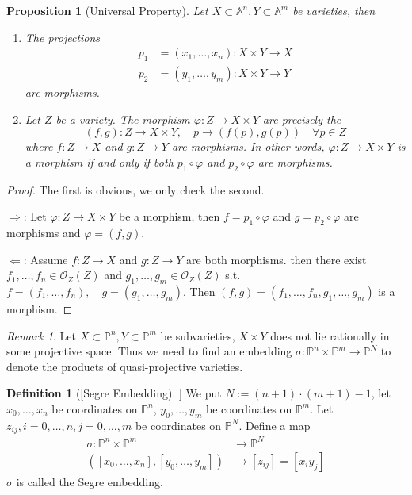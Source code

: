 \documentclass{amsart}
\theoremstyle{plain}
\newtheorem{proposition}{Proposition}
\theoremstyle{definition}
\newtheorem{definition}{Definition}
\theoremstyle{remark}
\newtheorem*{remark}{Remark}
\numberwithin{equation}{section}
\begin{document}
\begin{proposition}[Universal Property]\label{19}
	Let $ X\subset\mathbb{A}^n,Y \subset \mathbb{A}^m$ be varieties, then
	\begin{enumerate}
		\item The projections
		$$\begin{array}{cc}
			p_1 & =(x_1,\dots,x_n): X\times Y\to X\\
			p_2 & =(y_1,\dots,y_m): X\times Y\to Y
		\end{array}$$
		are morphisms.
		\item Let $ Z $ be a variety. The morphism $ \varphi : Z\to X \times Y $ are precisely the
		$$
		(f,g):Z\to X\times Y,\quad p\to (f(p),g(p))\quad\forall p\in Z
		$$
		where $ f:Z\to X $ and $ g:Z\to Y $ are morphisms. In other words, $ \varphi:Z\to X\times Y $ is a morphism if and only if both $ p_1\circ \varphi $ and $ p_2\circ\varphi  $ are morphisms.
	\end{enumerate}
\end{proposition}
\begin{proof}
	The first is obvious, we only check the second.

	$ \Rightarrow $: Let $ \varphi:Z\to X\times Y $ be a morphism, then $ f=p_1\circ\varphi $ and $ g=p_2\circ\varphi $ are morphisms and $ \varphi=(f,g) $.

	$ \Leftarrow $: Assume $ f:Z\to X $ and $ g:Z\to Y $ are both morphisms. then there exist $ f_1,\dots,f_n\in \mathcal{O}_Z(Z) $ and $ g_1,\dots,g_m\in \mathcal{O}_Z(Z) $ s.t.
	$ f=(f_1,\dots,f_n),\quad g=(g_1,\dots,g_m) $. Then $ (f,g)=(f_1,\dots,f_n,g_1,\dots,g_m) $ is a morphism.
\end{proof}
\begin{remark}
	Let $ X\subset \mathbb{P}^n,Y\subset \mathbb{P}^m $ be subvarieties, $ X\times Y $ does not lie rationally in some projective space. Thus we need to find an embedding $ \sigma :\mathbb{P}^n\times \mathbb{P}^m \to \mathbb{P}^N$ to denote the products of quasi-projective varieties.
\end{remark}
\begin{definition}[[Segre Embedding]]
	We put $ N:=(n+1)\cdot (m+1)-1 $, let $ x_0,\dots,x_n $ be coordinates on $ \mathbb{P}^n $, $ y_0,\dots,y_m $ be coordinates on $ \mathbb{P}^m $. Let $ z_{ij}, i=0,\dots,n, j=0,\dots,m $ be coordinates on $ \mathbb{P}^N $. Define a map
	$$\begin{array}{cc}
	\sigma:\mathbb{P}^n\times \mathbb{P}^m & \to  \mathbb{P}^N\\
	([x_0,\dots,x_n],[y_0,\dots,y_m]) & \to  [z_{ij}]=[x_iy_j]
	\end{array}$$
	$ \sigma $ is called the Segre embedding.
\end{definition}
\end{document}

